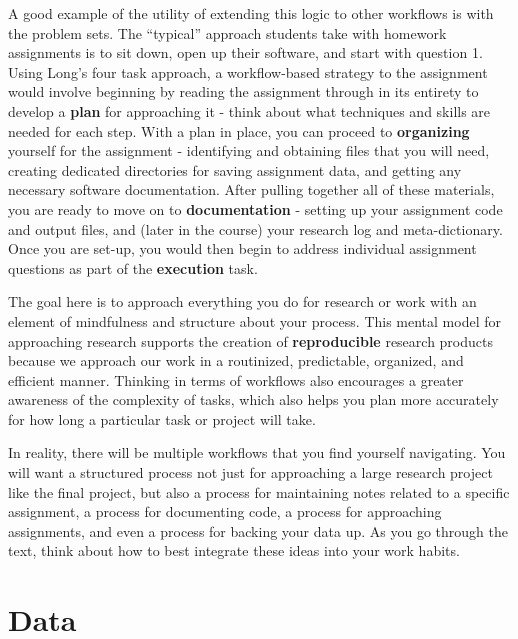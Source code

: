 \documentclass[]{book}
\theoremstyle{definition}
\theoremstyle{definition}
\theoremstyle{definition}
\theoremstyle{remark}
\begin{document}
A good example of the utility of extending this logic to other workflows
is with the problem sets. The ``typical'' approach students take with
homework assignments is to sit down, open up their software, and start
with question 1. Using Long's four task approach, a workflow-based
strategy to the assignment would involve beginning by reading the
assignment through in its entirety to develop a \textbf{plan} for
approaching it - think about what techniques and skills are needed for
each step. With a plan in place, you can proceed to \textbf{organizing}
yourself for the assignment - identifying and obtaining files that you
will need, creating dedicated directories for saving assignment data,
and getting any necessary software documentation. After pulling together
all of these materials, you are ready to move on to
\textbf{documentation} - setting up your assignment code and output
files, and (later in the course) your research log and meta-dictionary.
Once you are set-up, you would then begin to address individual
assignment questions as part of the \textbf{execution} task.

The goal here is to approach everything you do for research or work with
an element of mindfulness and structure about your process. This mental
model for approaching research supports the creation of
\textbf{reproducible} research products because we approach our work in
a routinized, predictable, organized, and efficient manner. Thinking in
terms of workflows also encourages a greater awareness of the complexity
of tasks, which also helps you plan more accurately for how long a
particular task or project will take.

In reality, there will be multiple workflows that you find yourself
navigating. You will want a structured process not just for approaching
a large research project like the final project, but also a process for
maintaining notes related to a specific assignment, a process for
documenting code, a process for approaching assignments, and even a
process for backing your data up. As you go through the text, think
about how to best integrate these ideas into your work habits.

\section{Data}\label{data-1}
\end{document}

